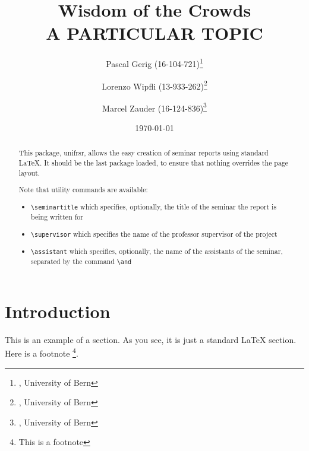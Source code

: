 \documentclass[a4paper,12pt]{report}
\begin{document}

	\title{Wisdom of the Crowds \\ A PARTICULAR TOPIC} %

	\author{Pascal Gerig (16-104-721)\thanks{, University of Bern}
   		\and Lorenzo Wipfli  (13-933-262)\thanks{, University of Bern}
   		\and Marcel Zauder  (16-124-836)\thanks{, University of Bern}
   	}	%



	\date{\today} %

	\maketitle

	\begin{abstract}
		This package, \textsf{unifrsr}, allows the easy creation of seminar
		reports using standard \LaTeX. It should be the last
		package loaded, to ensure that nothing overrides the page layout.

		Note that utility commands are available: 
		\begin{itemize}
			\item \verb+\seminartitle+ which specifies, optionally, the title of the seminar the report is being written for
			\item \verb+\supervisor+ which specifies the name of the professor supervisor of the project
			\item \verb+\assistant+ which specifies, optionally, the name of the assistants of the seminar, separated by the command \verb+\and+
		\end{itemize}

	\end{abstract}

	\tableofcontents

	\chapter{Introduction}
		This is an example of a section. As you see, it is just a standard {\LaTeX} section. Here is a footnote%
		\footnote{This is a footnote}.
\end{document}
